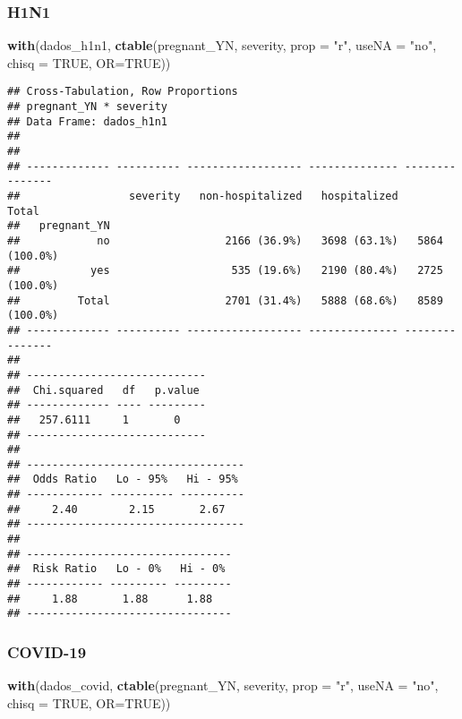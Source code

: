 \documentclass[
]{article}
\newenvironment{Shaded}{\begin{snugshade}}{\end{snugshade}}
\newcommand{\DataTypeTok}[1]{\textcolor[rgb]{0.13,0.29,0.53}{#1}}
\newcommand{\KeywordTok}[1]{\textcolor[rgb]{0.13,0.29,0.53}{\textbf{#1}}}
\newcommand{\NormalTok}[1]{#1}
\newcommand{\OtherTok}[1]{\textcolor[rgb]{0.56,0.35,0.01}{#1}}
\newcommand{\StringTok}[1]{\textcolor[rgb]{0.31,0.60,0.02}{#1}}
\begin{document}
\hypertarget{h1n1-10}{%
\subsubsection{H1N1}\label{h1n1-10}}

\begin{Shaded}
\begin{Highlighting}[]
\KeywordTok{with}\NormalTok{(dados_h1n1, }\KeywordTok{ctable}\NormalTok{(pregnant_YN, severity, }\DataTypeTok{prop =} \StringTok{"r"}\NormalTok{, }\DataTypeTok{useNA =} \StringTok{"no"}\NormalTok{, }\DataTypeTok{chisq =} \OtherTok{TRUE}\NormalTok{, }\DataTypeTok{OR=}\OtherTok{TRUE}\NormalTok{))}
\end{Highlighting}
\end{Shaded}

\begin{verbatim}
## Cross-Tabulation, Row Proportions  
## pregnant_YN * severity  
## Data Frame: dados_h1n1  
## 
## 
## ------------- ---------- ------------------ -------------- ---------------
##                 severity   non-hospitalized   hospitalized           Total
##   pregnant_YN                                                             
##            no                  2166 (36.9%)   3698 (63.1%)   5864 (100.0%)
##           yes                   535 (19.6%)   2190 (80.4%)   2725 (100.0%)
##         Total                  2701 (31.4%)   5888 (68.6%)   8589 (100.0%)
## ------------- ---------- ------------------ -------------- ---------------
## 
## ----------------------------
##  Chi.squared   df   p.value 
## ------------- ---- ---------
##   257.6111     1       0    
## ----------------------------
## 
## ----------------------------------
##  Odds Ratio   Lo - 95%   Hi - 95% 
## ------------ ---------- ----------
##     2.40        2.15       2.67   
## ----------------------------------
## 
## --------------------------------
##  Risk Ratio   Lo - 0%   Hi - 0% 
## ------------ --------- ---------
##     1.88       1.88      1.88   
## --------------------------------
\end{verbatim}

\hypertarget{covid-19-10}{%
\subsubsection{COVID-19}\label{covid-19-10}}

\begin{Shaded}
\begin{Highlighting}[]
\KeywordTok{with}\NormalTok{(dados_covid, }\KeywordTok{ctable}\NormalTok{(pregnant_YN, severity, }\DataTypeTok{prop =} \StringTok{"r"}\NormalTok{, }\DataTypeTok{useNA =} \StringTok{"no"}\NormalTok{, }\DataTypeTok{chisq =} \OtherTok{TRUE}\NormalTok{, }\DataTypeTok{OR=}\OtherTok{TRUE}\NormalTok{))}
\end{Highlighting}
\end{Shaded}
\end{document}
